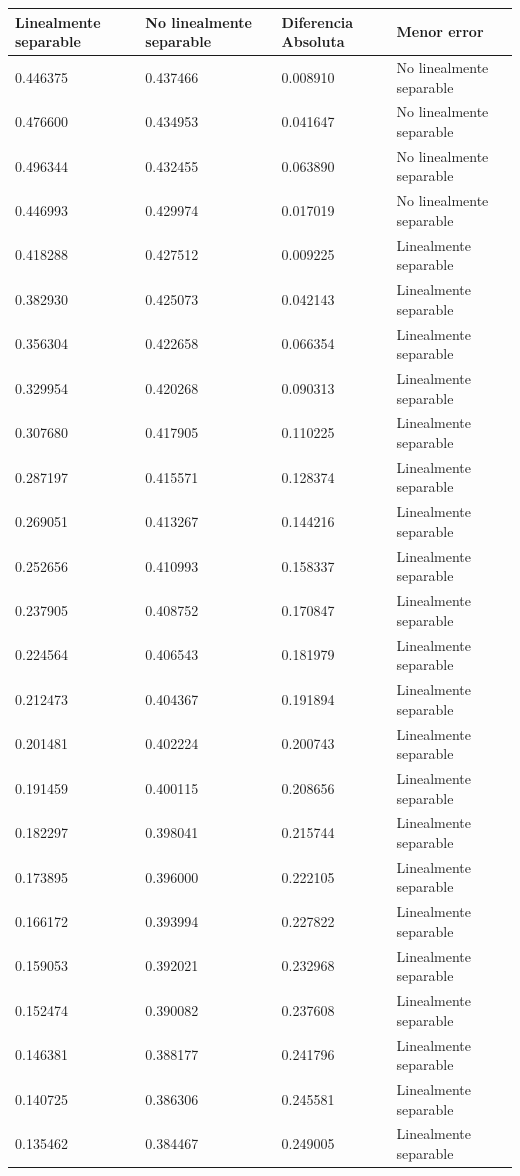 \begin{tabular}{llll}
\toprule
Linealmente separable & No linealmente separable & Diferencia Absoluta & Menor error \\
\midrule
0.446375 & 0.437466 & 0.008910 & No linealmente separable \\
0.476600 & 0.434953 & 0.041647 & No linealmente separable \\
0.496344 & 0.432455 & 0.063890 & No linealmente separable \\
0.446993 & 0.429974 & 0.017019 & No linealmente separable \\
0.418288 & 0.427512 & 0.009225 & Linealmente separable \\
0.382930 & 0.425073 & 0.042143 & Linealmente separable \\
0.356304 & 0.422658 & 0.066354 & Linealmente separable \\
0.329954 & 0.420268 & 0.090313 & Linealmente separable \\
0.307680 & 0.417905 & 0.110225 & Linealmente separable \\
0.287197 & 0.415571 & 0.128374 & Linealmente separable \\
0.269051 & 0.413267 & 0.144216 & Linealmente separable \\
0.252656 & 0.410993 & 0.158337 & Linealmente separable \\
0.237905 & 0.408752 & 0.170847 & Linealmente separable \\
0.224564 & 0.406543 & 0.181979 & Linealmente separable \\
0.212473 & 0.404367 & 0.191894 & Linealmente separable \\
0.201481 & 0.402224 & 0.200743 & Linealmente separable \\
0.191459 & 0.400115 & 0.208656 & Linealmente separable \\
0.182297 & 0.398041 & 0.215744 & Linealmente separable \\
0.173895 & 0.396000 & 0.222105 & Linealmente separable \\
0.166172 & 0.393994 & 0.227822 & Linealmente separable \\
0.159053 & 0.392021 & 0.232968 & Linealmente separable \\
0.152474 & 0.390082 & 0.237608 & Linealmente separable \\
0.146381 & 0.388177 & 0.241796 & Linealmente separable \\
0.140725 & 0.386306 & 0.245581 & Linealmente separable \\
0.135462 & 0.384467 & 0.249005 & Linealmente separable \\

\end{tabular}
